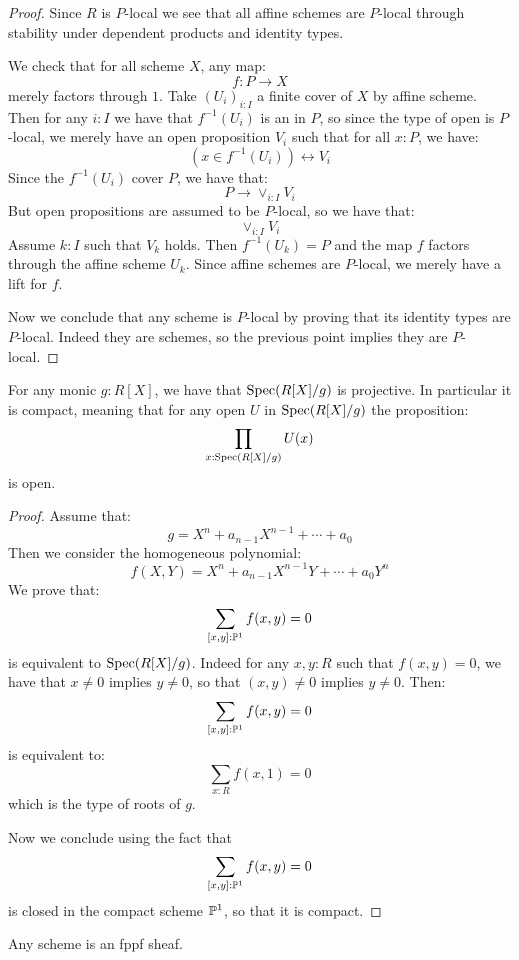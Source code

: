\begin{proof}
Since $R$ is $P$-local we see that all affine schemes are $P$-local through stability under dependent products and identity types.

We check that for all scheme $X$, any map:
\[f:P\to X\]
merely factors through $1$. Take $(U_i)_{i:I}$ a finite cover of $X$ by affine scheme. Then for any $i:I$ we have that $f^{-1}(U_i)$ is an in $P$, so since the type of open is $P$-local, we merely have an open proposition $V_i$ such that for all $x:P$, we have:
\[(x\in f^{-1}(U_i) )\leftrightarrow V_i\]
Since the $f^{-1}(U_i)$ cover $P$, we have that:
\[P\to \lor_{i:I} V_i\]
But open propositions are assumed to be $P$-local, so we have that:
\[ \lor_{i:I} V_i\]
Assume $k:I$ such that $V_k$ holds. Then $f^{-1}(U_k) = P$ and the map $f$ factors through the affine scheme $U_k$. Since affine schemes are $P$-local, we merely have a lift for $f$.

Now we conclude that any scheme is $P$-local by proving that its identity types are $P$-local. Indeed they are schemes, so the previous point implies they are $P$-local.
\end{proof}

\begin{lemma}\label{roots-monic-proper}
For any monic $g:R[X]$, we have that $\operatorname{Spec}(R[X]/g)$ is projective. In particular it is compact, meaning that for any open $U$ in $\operatorname{Spec}(R[X]/g)$ the proposition:
\[\prod_{x:\operatorname{Spec}(R[X]/g)}U(x)\]
is open.
\end{lemma}

\begin{proof}
Assume that:
\[g=X^n+a_{n-1}X^{n-1}+\cdots+a_0\]
Then we consider the homogeneous polynomial:
\[f(X,Y) = X^n + a_{n-1}X^{n-1}Y+\cdots+a_0Y^n\]
We prove that:
\[\sum_{[x,y]:\mathbb{P}^1}f(x,y) = 0\]
is equivalent to $\operatorname{Spec}(R[X]/g)$. Indeed for any $x,y:R$ such that $f(x,y)=0$, we have that $x\not=0$ implies $y\not=0$, so that $(x,y)\not=0$ implies $y\not=0$. Then:
\[\sum_{[x,y]:\mathbb{P}^1}f(x,y) = 0\]
is equivalent to:
\[\sum_{x:R} f(x,1)=0\]
which is the type of roots of $g$. 

Now we conclude using the fact that 
\[\sum_{[x,y]:\mathbb{P}^1}f(x,y) = 0\]
is closed in the compact scheme $\mathbb{P}^1$, so that it is compact.
\end{proof}

\begin{proposition}\label{scheme-is-fppf-sheaf}
Any scheme is an fppf sheaf.
\end{proposition}

